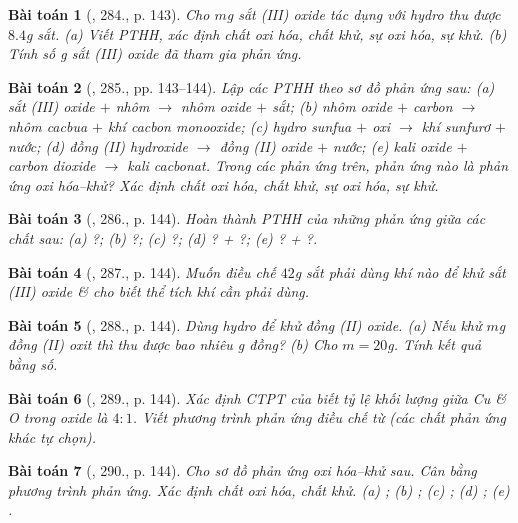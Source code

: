 \documentclass{article}
\newtheorem{baitoan}{Bài toán}
\begin{document}
\begin{baitoan}[\cite{An_400_BT_Hoa_Hoc_8_2020}, 284., p. 143]
	Cho $m$\emph{g} sắt (III) oxide tác dụng với hydro thu được $8.4$\emph{g} sắt. (a) Viết PTHH, xác định chất oxi hóa, chất khử, sự oxi hóa, sự khử. (b) Tính số \emph{g} sắt (III) oxide đã tham gia phản ứng.
\end{baitoan}

\begin{baitoan}[\cite{An_400_BT_Hoa_Hoc_8_2020}, 285., pp. 143--144]
	Lập các PTHH theo sơ đồ phản ứng sau: (a) sắt (III) oxide $+$ nhôm $\to$ nhôm oxide $+$ sắt; (b) nhôm oxide $+$ carbon $\to$ nhôm cacbua $+$ khí cacbon monooxide; (c) hydro sunfua $+$ oxi $\to$ khí sunfurơ $+$ nước; (d) đồng (II) hydroxide $\to$ đồng (II) oxide $+$ nước; (e) kali oxide $+$ carbon dioxide $\to$ kali cacbonat. Trong các phản ứng trên, phản ứng nào là phản ứng oxi hóa--khử? Xác định chất oxi hóa, chất khử, sự oxi hóa, sự khử.
\end{baitoan}

\begin{baitoan}[\cite{An_400_BT_Hoa_Hoc_8_2020}, 286., p. 144]
	Hoàn thành PTHH của những phản ứng giữa các chất sau: (a) \emph{} ?; (b) \emph{} ?; (c) \emph{} ?; (d) \emph{} ? + ?; (e) \emph{} ? + ?.
\end{baitoan}

\begin{baitoan}[\cite{An_400_BT_Hoa_Hoc_8_2020}, 287., p. 144]
	Muốn điều chế $42$\emph{g} sắt phải dùng khí nào để khử sắt (III) oxide \& cho biết thể tích khí cần phải dùng.
\end{baitoan}

\begin{baitoan}[\cite{An_400_BT_Hoa_Hoc_8_2020}, 288., p. 144]
	Dùng hydro để khử đồng (II) oxide. (a) Nếu khử $m$\emph{g} đồng (II) oxit thì thu được bao nhiêu \emph{g} đồng? (b) Cho $m = 20$\emph{g}. Tính kết quả bằng số.
\end{baitoan}

\begin{baitoan}[\cite{An_400_BT_Hoa_Hoc_8_2020}, 289., p. 144]
	Xác định CTPT của \emph{} biết tỷ lệ khối lượng giữa \emph{Cu} \& \emph{O} trong oxide là $4:1$. Viết phương trình phản ứng điều chế \emph{} từ \emph{} (các chất phản ứng khác tự chọn).
\end{baitoan}

\begin{baitoan}[\cite{An_400_BT_Hoa_Hoc_8_2020}, 290., p. 144]
	Cho sơ đồ phản ứng oxi hóa--khử sau. Cân bằng phương trình phản ứng. Xác định chất oxi hóa, chất khử. (a) \emph{}; (b) \emph{}; (c) \emph{}; (d) \emph{}; (e) \emph{}.
\end{baitoan}
\end{document}
